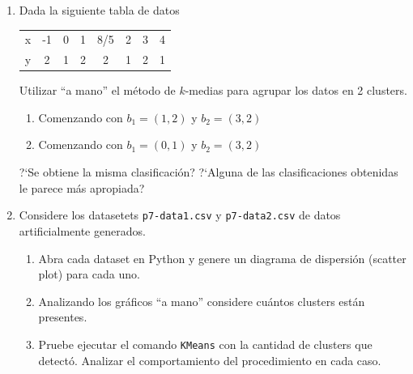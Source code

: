 \documentclass[a4paper,11pt]{article}
\theoremstyle{definition}
\begin{document}
\begin{enumerate}
\item Dada la siguiente tabla de datos
\begin{table}[h]
\begin{center}
\begin{tabular}{|c|c|c|c|c|c|c|c|}
\hline
x & -1 & 0 & 1 & 8/5 & 2 & 3 & 4  \\
y  & 2 & 1& 2& 2& 1& 2 & 1 \\
\hline
\end{tabular}
\end{center}
\end{table}

Utilizar ``a mano'' el m\'etodo de $k$-medias para agrupar los datos en 2 clusters.
\begin{enumerate}
\item Comenzando con $b_1 =(1,2)  $ y $b_2=(3,2)  $
\item Comenzando con $b_1=(0,1)   $ y $b_2= (3,2) $
\end{enumerate}

?`Se obtiene la misma clasificaci\'on? ?`Alguna de las clasificaciones obtenidas le parece m\'as apropiada?

\item Considere los datasetets \texttt{p7-data1.csv} y \texttt{p7-data2.csv} de datos artificialmente generados.

\begin{enumerate}
	\item Abra cada dataset en Python y genere un diagrama de dispersi\'on (scatter plot) para cada uno.
	\item Analizando los gr\'aficos ``a mano'' considere cu\'antos clusters est\'an presentes.
	\item Pruebe ejecutar el comando \texttt{KMeans} con la cantidad de clusters que detect\'o. Analizar el comportamiento del procedimiento en cada caso.
	
\end{enumerate}




\end{enumerate}
\end{document}
